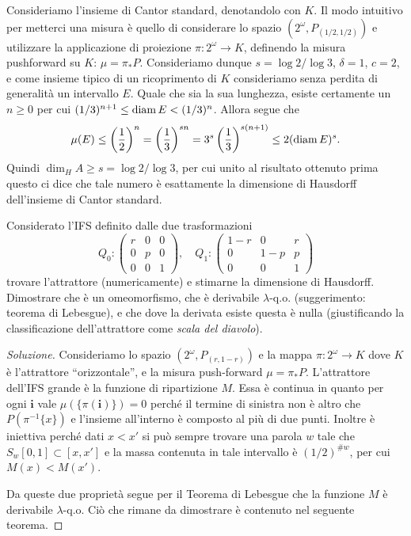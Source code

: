 \begin{esempio}
	Consideriamo l'insieme di Cantor standard, denotandolo con $K$. Il modo intuitivo per metterci una misura è quello di considerare lo spazio $(2^{\omega}, P_{(1/2,1/2)})$ e utilizzare la applicazione di proiezione $\pi:2^{\omega}\to K$, definendo la misura pushforward su $K$: $\mu = \pi_{*}P$.
	Consideriamo dunque $s = \log2/\log3$, $\delta = 1$, $c = 2$, e come insieme tipico di un ricoprimento di $K$ consideriamo senza perdita di generalità un intervallo $E$.
	Quale che sia la sua lunghezza, esiste certamente un $n\geq0$ per cui $(1/3)^{n+1}\leq \operatorname{diam} E < (1/3)^{n}$.
	Allora segue che 
	$$\mu(E) \leq \left(\frac{1}{2}\right)^{n} = \left(\frac{1}{3}\right)^{sn} = 3^{s}\left(\frac{1}{3}\right)^{s(n+1)} \leq 2(\operatorname{diam} E)^{s}.$$
	Quindi $\dim_{H}A\geq s = \log2/\log3$, per cui unito al risultato ottenuto prima questo ci dice che tale numero è esattamente la dimensione di Hausdorff dell'insieme di Cantor standard.
\end{esempio}

\begin{esercizio}
	Considerato l'IFS definito dalle due trasformazioni
	$$Q_{0}: \left(\begin{array}{ccc}r & 0 & 0 \\0 & p & 0 \\0 & 0 & 1\end{array}\right),\quad
	Q_{1}:\left(\begin{array}{ccc}1-r & 0 & r \\0 & 1-p & p \\0 & 0 & 1\end{array}\right)$$
	trovare l'attrattore (numericamente) e stimarne la dimensione di Hausdorff.
	Dimostrare che è un omeomorfismo, che è derivabile $\lambda$-q.o. (suggerimento: teorema di Lebesgue), e che dove la derivata esiste questa è nulla (giustificando la classificazione dell'attrattore come \emph{scala del diavolo}).
\end{esercizio}

\begin{proof}[Soluzione]
	Consideriamo lo spazio $(2^{\omega}, P_{(r,1-r)})$ e la mappa $\pi:2^{\omega}\to K$ dove $K$ è l'attrattore ``orizzontale'', e la misura push-forward $\mu = \pi_{*}P$.
	L'attrattore dell'IFS grande è la funzione di ripartizione $M$. 
	Essa è continua in quanto per ogni $\mathbf i$ vale $\mu(\{\pi(\mathbf i)\}) = 0$ perché il termine di sinistra non è altro che $P(\pi^{-1}\{x\})$ e l'insieme all'interno è composto al più di due punti.
	Inoltre è iniettiva perché dati $x<x'$ si può sempre trovare una parola $w$ tale che $S_{w}[0,1]\subset[x,x']$ e la massa contenuta in tale intervallo è $(1/2)^{\#w}$, per cui $M(x)<M(x')$.
	
	Da queste due proprietà segue per il Teorema di Lebesgue che la funzione $M$ è derivabile $\lambda$-q.o.
	Ciò che rimane da dimostrare è contenuto nel seguente teorema.
\end{proof}

